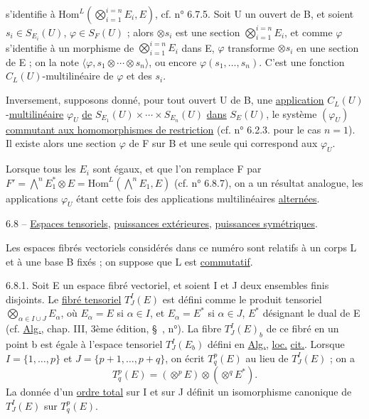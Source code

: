 s'identifie à $\mathrm{Hom}^L(\bigotimes_{i=1}^{i=n}E_i,E)$, cf. n° 6.7.5. Soit U un ouvert de B, et soient $s_i\in S_{E_i}(U)$, $\varphi\in S_F(U)$ ; alors $\otimes s_i$ est une section $\bigotimes_{i=1}^{i=n}E_i$, et comme $\varphi$ s'identifie à un morphisme de $\bigotimes_{i=1}^{i=n}E_i$ dans E, $\varphi$ transforme $\otimes s_i$ en une section de E ; on la note $\langle\varphi,s_1\otimes\cdots\otimes s_n\rangle$, ou encore $\varphi(s_1,\ldots,s_n)$. C'est une fonction $C_L(U)$-multilinéaire de $\varphi$ et des $s_i$.

Inversement, supposons donné, pour tout ouvert U de B, une \uline{application} $C_L(U)$-\uline{multilinéaire} $\varphi_U$ \uline{de} $S_{E_1}(U)\times\cdots\times S_{E_n}(U)$ \uline{dans} $S_E(U)$, le système $(\varphi_U)$ \uline{commutant aux homomorphismes de restriction} (cf. n° 6.2.3. pour le cas $n=1$). Il existe alors une section $\varphi$ de F sur B et une seule qui correspond aux $\varphi_U$.

Lorsque tous les $E_i$ sont égaux, et que l'on remplace F par $F'=\bigwedge^n E_1^*\otimes E=\mathrm{Hom}^L(\bigwedge^n E_1,E)$ (cf. n° 6.8.7), on a un résultat analogue, les applications $\varphi_U$ étant cette fois des applications multilinéaires \uline{alternées}.

6.8 -- \uline{Espaces tensoriels}, \uline{puissances extérieures}, \uline{puissances symétriques}.

Les espaces fibrés vectoriels considérés dans ce numéro sont relatifs à un corps L et à une base B fixés ; on suppose que L est \uline{commutatif}.

6.8.1. Soit E un espace fibré vectoriel, et soient I et J deux ensembles finis disjoints. Le \uline{fibré tensoriel} $T_J^I(E)$ est défini comme le produit tensoriel $\bigotimes_{\alpha\in I\cup J}E_\alpha$, où $E_\alpha=E$ si $\alpha\in I$, et $E_\alpha=E^*$ si $\alpha\in J$, $E^*$ désignant le dual de E (cf. \uline{Alg.}, chap. III, 3ème édition, \S\ \qquad, n°\qquad). La fibre $T_J^I(E)_b$ de ce fibré en un point b est égale à l'espace tensoriel $T_J^I(E_b)$ défini en \uline{Alg.}, \uline{loc.} \uline{cit.}. Lorsque $I=\{1,\ldots,p\}$ et $J=\{p+1,\ldots,p+q\}$, on écrit $T_q^p(E)$ au lieu de $T_J^I(E)$ ; on a
\[
T_q^p(E)=(\otimes^p E)\otimes(\otimes^q E^*).
\]
La donnée d'un \uline{ordre total} sur I et sur J définit un isomorphisme canonique de $T_J^I(E)$ sur $T_q^p(E)$.
